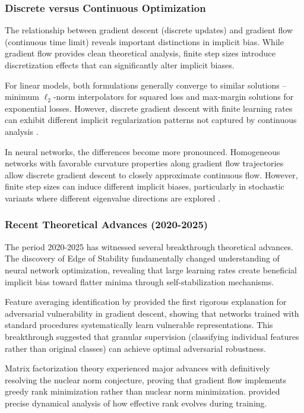 \documentclass[11pt]{article}
\begin{document}
\subsubsection{Discrete versus Continuous Optimization}

The relationship between gradient descent (discrete updates) and gradient flow (continuous time limit) reveals important distinctions in implicit bias. While gradient flow provides clean theoretical analysis, finite step sizes introduce discretization effects that can significantly alter implicit biases.

For linear models, both formulations generally converge to similar solutions -- minimum $\ell_2$-norm interpolators for squared loss and max-margin solutions for exponential losses. However, discrete gradient descent with finite learning rates can exhibit different implicit regularization patterns not captured by continuous analysis \citep{pesme2021continuous}.

In neural networks, the differences become more pronounced. Homogeneous networks with favorable curvature properties along gradient flow trajectories allow discrete gradient descent to closely approximate continuous flow. However, finite step sizes can induce different implicit biases, particularly in stochastic variants where different eigenvalue directions are explored \citep{mulayoff2021continuous}.

\subsubsection{Recent Theoretical Advances (2020-2025)}

The period 2020-2025 has witnessed several breakthrough theoretical advances. The discovery of Edge of Stability fundamentally changed understanding of neural network optimization, revealing that large learning rates create beneficial implicit bias toward flatter minima through self-stabilization mechanisms.

Feature averaging identification by \citet{li2024feature} provided the first rigorous explanation for adversarial vulnerability in gradient descent, showing that networks trained with standard procedures systematically learn vulnerable representations. This breakthrough suggested that granular supervision (classifying individual features rather than original classes) can achieve optimal adversarial robustness.

Matrix factorization theory experienced major advances with \citet{li2020towards} definitively resolving the nuclear norm conjecture, proving that gradient flow implements greedy rank minimization rather than nuclear norm minimization. \citet{chou2024gradient} provided precise dynamical analysis of how effective rank evolves during training.
\end{document}
